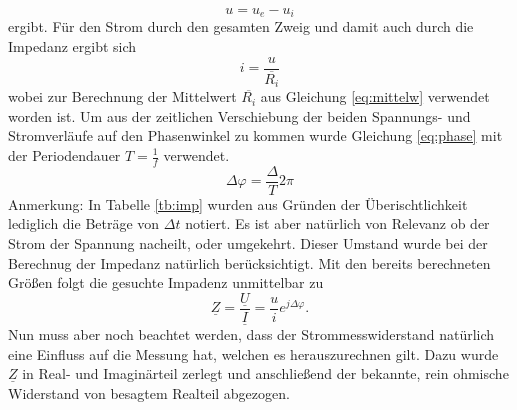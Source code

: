 \begin{equation}
	u = u_e - u_i
\end{equation}
ergibt. Für den Strom durch den gesamten Zweig und damit auch durch die Impedanz ergibt sich
\begin{equation}
	i = \frac{u}{\overline{R_i}}
\end{equation}
wobei zur Berechnung der Mittelwert $\overline{R_i}$ aus Gleichung \ref{eq:mittelw} verwendet worden ist. Um aus der zeitlichen Verschiebung der beiden Spannungs- und Stromverläufe auf den Phasenwinkel zu kommen wurde Gleichung \ref{eq:phase} mit der Periodendauer $T = \frac{1}{f}$ verwendet.
\begin{equation}
	\Delta \varphi = \frac{\Delta}{T}2 \pi
	\label{eq:phase}
\end{equation}
Anmerkung: In Tabelle \ref{tb:imp} wurden aus Gründen der Überischtlichkeit lediglich die Beträge von $\Delta t$ notiert. Es ist aber natürlich von Relevanz ob der Strom der Spannung nacheilt, oder umgekehrt. Dieser Umstand wurde bei der Berechnug der Impedanz natürlich berücksichtigt.
Mit den bereits berechneten Größen folgt die gesuchte Impadenz unmittelbar zu 
\begin{equation}
	\underline{Z} = \frac{\underline{U}}{\underline{I}} = \frac{u}{i} e^{j\Delta \varphi} .
\end{equation}
Nun muss aber noch beachtet werden, dass der Strommesswiderstand natürlich eine Einfluss auf die Messung hat, welchen es herauszurechnen gilt. Dazu wurde $\underline{Z}$ in Real- und Imaginärteil zerlegt und anschließend der bekannte, rein ohmische Widerstand von besagtem Realteil abgezogen. 
